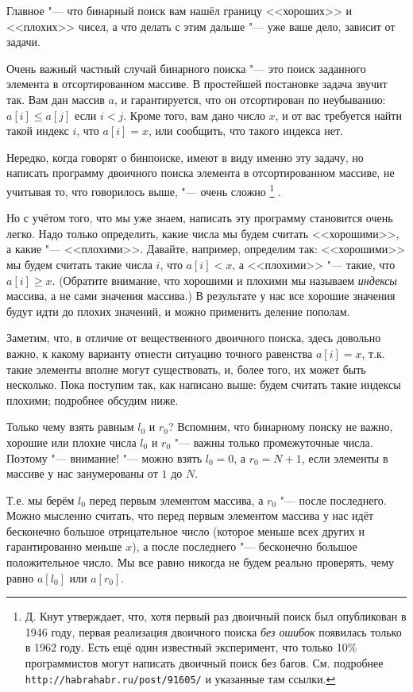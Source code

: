 \documentclass[a4paper,10pt]{problems}
\begin{document}
Главное "--- что бинарный поиск вам нашёл границу <<хороших>> и <<плохих>> чисел,
а что делать с этим дальше "--- уже ваше дело, зависит от задачи.

Очень важный частный случай бинарного поиска "--- это поиск заданного элемента в отсортированном массиве.
В простейшей постановке задача звучит так.
Вам дан массив $a$, и гарантируется, что он отсортирован по неубыванию: $a[i]\leq a[j]$ если $i<j$.
Кроме того, вам дано число $x$, и от вас требуется найти такой индекс $i$, что $a[i]=x$,
или сообщить, что такого индекса нет.

Нередко, когда говорят о бинпоиске, имеют в виду именно эту задачу, но написать программу
двоичного поиска элемента в отсортированном массиве, не учитывая то, что говорилось выше,
"--- очень сложно%
\footnote{Д. Кнут утверждает, что, хотя первый раз двоичный поиск был опубликован в 1946 году,
первая реализация двоичного поиска \textit{без ошибок} появилась только в 1962 году. 
Есть ещё один известный эксперимент, что только 10\% программистов могут написать двоичный поиск без багов.
См. подробнее \texttt{http://habrahabr.ru/post/91605/} и указанные там ссылки.}%
.

Но с учётом того, что мы уже знаем, написать эту программу становится очень легко. 
Надо только определить, какие числа мы будем считать <<хорошими>>, а какие "--- <<плохими>>.
Давайте, например, определим так: <<хорошими>> мы будем считать такие числа $i$, что $a[i]<x$,
а <<плохими>> "--- такие, что $a[i]\geq x$. 
(Обратите внимание, что хорошими и плохими мы называем \textit{индексы} массива, а не сами значения массива.)
В результате у нас все хорошие значения будут идти до плохих значений, и можно применить деление пополам.

Заметим, что, в отличие от вещественного двоичного поиска, здесь довольно важно, к какому варианту 
отнести ситуацию точного равенства $a[i]=x$, т.к. такие элементы вполне могут существовать,
и, более того, их может быть несколько.
Пока поступим так, как написано выше: будем считать такие индексы плохими;
подробнее обсудим ниже.

Только чему взять равным $l_0$ и $r_0$?
Вспомним, что бинарному поиску не важно, хорошие или плохие числа $l_0$ и $r_0$ "---
важны только промежуточные числа. 
Поэтому "--- внимание! "--- можно взять $l_0=0$, а $r_0=N+1$, если элементы в массиве
у нас занумерованы от $1$ до $N$. 

Т.е. мы берём $l_0$ перед первым элементом массива, а $r_0$ "--- после последнего.
Можно мысленно считать, что перед первым элементом массива у нас идёт бесконечно большое отрицательное число
(которое меньше всех других и гарантированно меньше $x$), а после последнего "---
бесконечно большое положительное число.
Мы все равно никогда не будем реально проверять, чему равно $a[l_0]$ или $a[r_0]$.
\end{document}
